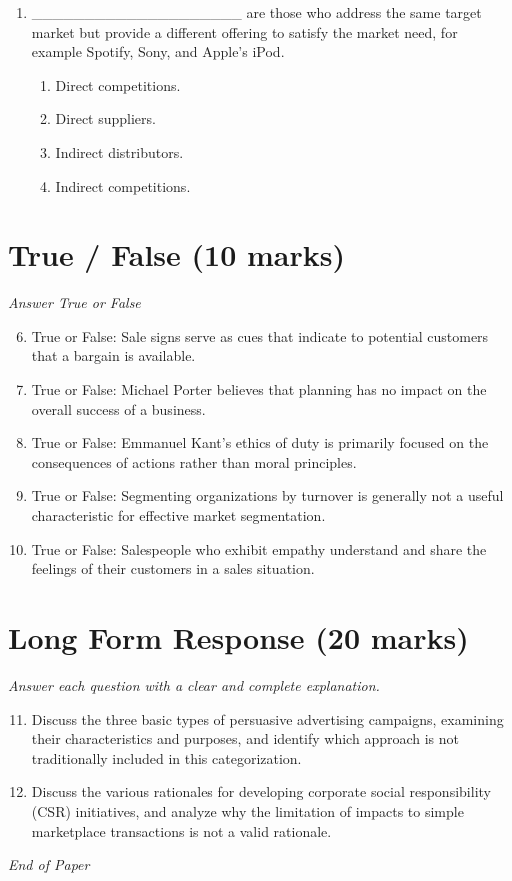 \documentclass[12pt]{article}
\begin{document}
\begin{enumerate}[label=\arabic*.]
\begin{enumerate}[label=(\alph*)]
\end{enumerate}
\item \_\_\_\_\_\_\_\_\_\_\_\_\_\_\_\_\_\_\_\_ are those who address the same target market but provide a different offering to satisfy the market need, for example Spotify, Sony, and Apple's iPod.
\begin{enumerate}[label=(\alph*)]
    \item Direct competitions.
    \item Direct suppliers.
    \item Indirect distributors.
    \item Indirect competitions.
\end{enumerate}
\end{enumerate}

\section*{True / False (10 marks)}
\textit{Answer True or False}
\begin{enumerate}[label=\arabic*.]
\setcounter{enumi}{5}
\item True or False: Sale signs serve as cues that indicate to potential customers that a bargain is available.
\item True or False: Michael Porter believes that planning has no impact on the overall success of a business.
\item True or False: Emmanuel Kant's ethics of duty is primarily focused on the consequences of actions rather than moral principles.
\item True or False: Segmenting organizations by turnover is generally not a useful characteristic for effective market segmentation.
\item True or False: Salespeople who exhibit empathy understand and share the feelings of their customers in a sales situation.
\end{enumerate}

\section*{Long Form Response (20 marks)}
\textit{Answer each question with a clear and complete explanation.}
\begin{enumerate}[label=\arabic*.]
\setcounter{enumi}{10}
\item Discuss the three basic types of persuasive advertising campaigns, examining their characteristics and purposes, and identify which approach is not traditionally included in this categorization.
\item Discuss the various rationales for developing corporate social responsibility (CSR) initiatives, and analyze why the limitation of impacts to simple marketplace transactions is not a valid rationale.
\end{enumerate}

\vfill
\noindent\textit{End of Paper}
\end{document}
